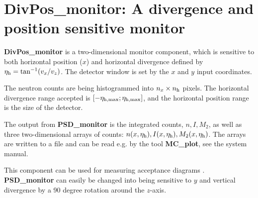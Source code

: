 \section{DivPos\_monitor: A divergence and position sensitive monitor}
\label{s:divpos-monitor}

{\bf DivPos\_monitor} is a two-dimensional monitor component,
which is sensitive to both horizontal position ($x$) and horizontal divergence
defined by $\eta_{\rm h} = \tan^{-1}(v_x/v_z)$.
The detector window is set
by the $x$ and $y$ input coordinates.

The neutron counts are being histogrammed
into $n_x \times n_{\rm h}$ pixels. The horizontal divergence range accepted is
$[-\eta_{\rm h,max}; \eta_{\rm h,max}]$, and the horizontal position
range is the size of the detector.

The output from {\bf PSD\_monitor} is the integrated counts, $n, I, M_2$,
as well as
three two-dimensional arrays of counts: $n(x,\eta_{\rm h}),
I(x,\eta_{\rm h}), M_2(x,\eta_{\rm h})$.
The arrays are written to a file and can be read e.g. by the tool
{\bf MC\_plot}, see the system manual.

This component can be used for measuring acceptance diagrams \cite{Cussen03}.
{\bf PSD\_monitor} can easily be changed into being sensitive
to $y$ and vertical divergence by a 90 degree rotation around the $z$-axis.
